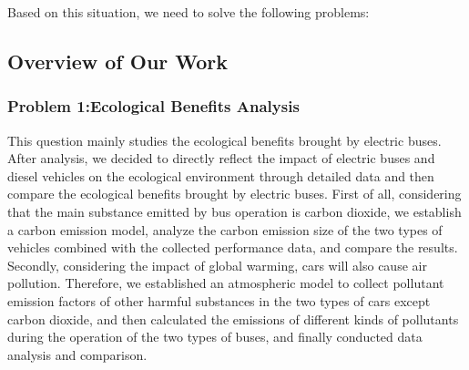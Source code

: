 \documentclass[12pt]{article}
\begin{document}
Based on this situation, we need to solve the following problems:





\subsection{Overview of Our Work} %

\subsubsection{Problem 1:Ecological Benefits Analysis}
This question mainly studies the ecological benefits brought by electric buses. After analysis, we decided to directly reflect the 
impact of electric buses and diesel vehicles on the ecological environment through detailed data and then compare the ecological 
benefits brought by electric buses. First of all, considering that the main substance emitted by bus operation is carbon dioxide, 
we establish a carbon emission model, analyze the carbon emission size of the two types of vehicles combined with the collected 
performance data, and compare the results. Secondly, considering the impact of global warming, cars will also cause air pollution. 
Therefore, we established an atmospheric model to collect pollutant emission factors of other harmful substances in the two types of 
cars except carbon dioxide, and then calculated the emissions of different kinds of pollutants during the operation of the two types 
of buses, and finally conducted data analysis and comparison.
\end{document}
